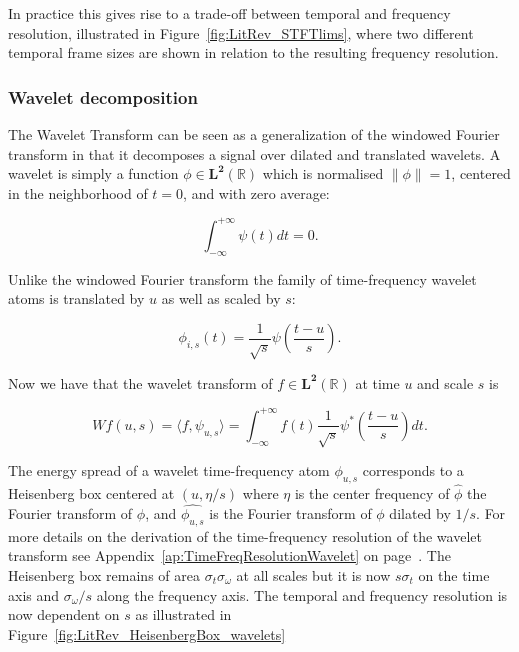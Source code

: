 In practice this gives rise to a trade-off between temporal and frequency resolution, illustrated in Figure~\ref{fig:LitRev_STFTlims}, where two different temporal frame sizes are shown in relation to the resulting frequency resolution.

\subsubsection{Wavelet decomposition}
The Wavelet Transform can be seen as a generalization of the windowed Fourier transform in that it decomposes a signal over dilated and translated wavelets. A wavelet is simply a function $\phi \in \mathbf{L^2}(\mathbb{R})$ which is normalised $\| \phi \| = 1$, centered in the neighborhood of $t=0$, and with zero average:

\begin{equation}\label{eq:Mallat1999_4}
\int^{+\infty}_{-\infty} \psi(t) dt = 0.
\end{equation}

Unlike the windowed Fourier transform the family of time-frequency wavelet atoms is translated by $u$ as well as scaled by $s$:

\begin{equation}\label{eq:Mallat1999_5}
\phi_{i,s}(t) = \frac{1}{\sqrt{s}}\psi\left(\frac{t-u}{s}\right).
\end{equation}

Now we have that the wavelet transform of $f \in \mathbf{L^2}(\mathbb{R})$ at time $u$ and scale $s$ is

\begin{equation}\label{eq:Mallat1999_x}
W f(u,s) = \langle f, \psi_{u,s} \rangle = \int^{+\infty}_{-\infty} f(t) \frac{1}{\sqrt{s}}\psi^\ast \left( \frac{t-u}{s} \right) dt.
\end{equation}

The energy spread of a wavelet time-frequency atom $\phi_{u,s}$ corresponds to a Heisenberg box centered at $(u,\eta/s)$ where $\eta$ is the center frequency of $\hat{\phi}$ the Fourier transform of $\phi$, and $\hat{\phi_{u,s}}$ is the Fourier transform of $\phi$ dilated by $1/s$. For more details on the derivation of the time-frequency resolution of the wavelet transform see Appendix~\ref{ap:TimeFreqResolutionWavelet} on page~\pageref{ap:TimeFreqResolutionWavelet}. The Heisenberg box remains of area $\sigma_t \sigma_\omega$ at all scales but it is now $s\sigma_t$ on the time axis and $\sigma_\omega /s$ along the frequency axis\cite{Mallat1999}. The temporal and frequency resolution is now dependent on $s$ as illustrated in Figure~\ref{fig:LitRev_HeisenbergBox_wavelets}

